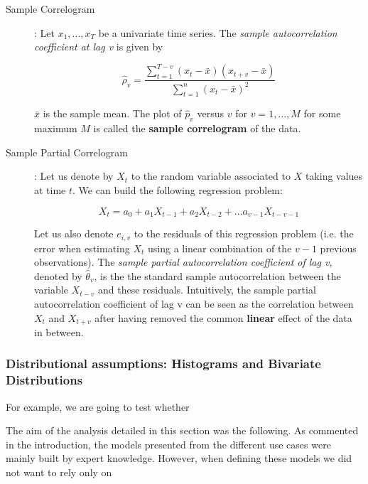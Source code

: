 \begin{description}
\item[Sample Correlogram]:  Let ${x_1,...,x_T}$ be a univariate time series. The \emph{sample autocorrelation coefficient at lag v} is given by 

$$ \hat{\rho}_v =\frac{\sum_{t=1}^{T-v} (x_t-\bar{x})(x_{t+v}-\bar{x})}{\sum_{t=1}^{n} (x_t-\bar{x})^2}$$ 

\noindent $\bar{x}$ is the sample mean. The plot of $\hat{p}_v$ versus $v$ for $v=1,...,M$ for some maximum $M$ is called the \textbf{sample correlogram} of the data.



\item[Sample Partial Correlogram]: Let us denote by $X_t$ to the random variable associated to $X$ taking values at time $t$. We can build the following regression problem:

$$ X_t = a_0 + a_1X_{t-1} + a_2X_{t-2} + ... a_{v-1}X_{t-v-1}$$

Let us also denote $e_{i,v}$ to the residuals of this regression problem (i.e. the error when estimating $X_t$ using a linear combination of the $v-1$ previous observations). The \emph{sample partial autocorrelation coefficient of lag v}, denoted by  $\hat{\theta}_v$, is the the standard sample autocorrelation between  the variable $X_{t-v}$ and these residuals. Intuitively, the sample partial autocorrelation coefficient of lag v can be seen as the correlation between $X_t$ and $X_{t+v}$ after having removed the common \textbf{linear} effect of the data in between.

\end{description}

\subsubsection*{Distributional assumptions: Histograms and Bivariate Distributions}





For example, we are going to test whether



The aim of the analysis detailed in this section was the following. As commented in the introduction, the models presented from the different use cases were mainly built by expert knowledge. However, when defining these models we did not want to rely only on 


